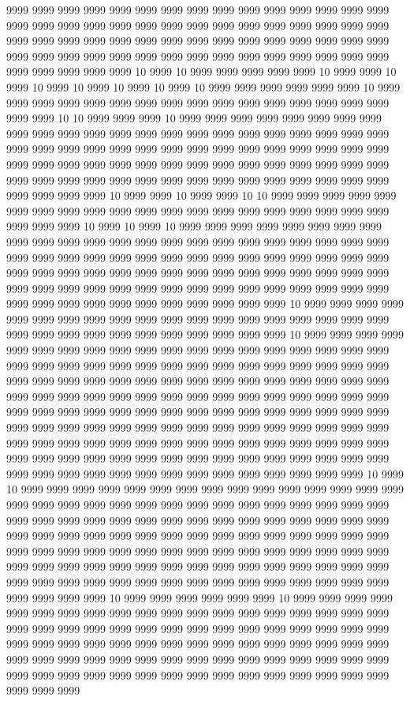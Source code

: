 9999 9999 9999 9999 9999 9999 9999 9999 9999 9999 9999 9999 9999 9999 9999 9999 9999 9999 9999 9999 9999 9999 9999 9999 9999 9999 9999 9999 9999 9999 9999 9999 9999 9999 9999 9999 9999 9999 9999 9999 9999 9999 9999 9999 9999 9999 9999 9999 9999 9999 9999 9999 9999 9999 9999 9999 9999 9999 9999 9999 9999 9999 9999 9999 9999 10 9999 10 9999 9999 9999 9999 9999 10 9999 9999 10 9999 10 9999 10 9999 10 9999 10 9999 10 9999 9999 9999 9999 9999 9999 10 9999 9999 9999 9999 9999 9999 9999 9999 9999 9999 9999 9999 9999 9999 9999 9999 9999 9999 10 10 9999 9999 9999 10 9999 9999 9999 9999 9999 9999 9999 9999 9999 9999 9999 9999 9999 9999 9999 9999 9999 9999 9999 9999 9999 9999 9999 9999 9999 9999 9999 9999 9999 9999 9999 9999 9999 9999 9999 9999 9999 9999 9999 9999 9999 9999 9999 9999 9999 9999 9999 9999 9999 9999 9999 9999 9999 9999 9999 9999 9999 9999 9999 9999 9999 9999 9999 9999 9999 9999 9999 9999 9999 9999 9999 9999 10 9999 9999 10 9999 9999 10 10 9999 9999 9999 9999 9999 9999 9999 9999 9999 9999 9999 9999 9999 9999 9999 9999 9999 9999 9999 9999 9999 9999 9999 10 9999 10 9999 10 9999 9999 9999 9999 9999 9999 9999 9999 9999 9999 9999 9999 9999 9999 9999 9999 9999 9999 9999 9999 9999 9999 9999 9999 9999 9999 9999 9999 9999 9999 9999 9999 9999 9999 9999 9999 9999 9999 9999 9999 9999 9999 9999 9999 9999 9999 9999 9999 9999 9999 9999 9999 9999 9999 9999 9999 9999 9999 9999 9999 9999 9999 9999 9999 9999 9999 9999 9999 9999 9999 9999 9999 9999 9999 9999 9999 9999 9999 9999 10 9999 9999 9999 9999 9999 9999 9999 9999 9999 9999 9999 9999 9999 9999 9999 9999 9999 9999 9999 9999 9999 9999 9999 9999 9999 9999 9999 9999 9999 9999 10 9999 9999 9999 9999 9999 9999 9999 9999 9999 9999 9999 9999 9999 9999 9999 9999 9999 9999 9999 9999 9999 9999 9999 9999 9999 9999 9999 9999 9999 9999 9999 9999 9999 9999 9999 9999 9999 9999 9999 9999 9999 9999 9999 9999 9999 9999 9999 9999 9999 9999 9999 9999 9999 9999 9999 9999 9999 9999 9999 9999 9999 9999 9999 9999 9999 9999 9999 9999 9999 9999 9999 9999 9999 9999 9999 9999 9999 9999 9999 9999 9999 9999 9999 9999 9999 9999 9999 9999 9999 9999 9999 9999 9999 9999 9999 9999 9999 9999 9999 9999 9999 9999 9999 9999 9999 9999 9999 9999 9999 9999 9999 9999 9999 9999 9999 9999 9999 9999 9999 9999 9999 9999 9999 9999 9999 9999 9999 9999 9999 9999 9999 9999 9999 9999 9999 9999 9999 9999 10 9999 10 9999 9999 9999 9999 9999 9999 9999 9999 9999 9999 9999 9999 9999 9999 9999 9999 9999 9999 9999 9999 9999 9999 9999 9999 9999 9999 9999 9999 9999 9999 9999 9999 9999 9999 9999 9999 9999 9999 9999 9999 9999 9999 9999 9999 9999 9999 9999 9999 9999 9999 9999 9999 9999 9999 9999 9999 9999 9999 9999 9999 9999 9999 9999 9999 9999 9999 9999 9999 9999 9999 9999 9999 9999 9999 9999 9999 9999 9999 9999 9999 9999 9999 9999 9999 9999 9999 9999 9999 9999 9999 9999 9999 9999 9999 9999 9999 9999 9999 9999 9999 9999 9999 9999 9999 9999 9999 9999 9999 9999 10 9999 9999 9999 9999 9999 9999 10 9999 9999 9999 9999 9999 9999 9999 9999 9999 9999 9999 9999 9999 9999 9999 9999 9999 9999 9999 9999 9999 9999 9999 9999 9999 9999 9999 9999 9999 9999 9999 9999 9999 9999 9999 9999 9999 9999 9999 9999 9999 9999 9999 9999 9999 9999 9999 9999 9999 9999 9999 9999 9999 9999 9999 9999 9999 9999 9999 9999 9999 9999 9999 9999 9999 9999 9999 9999 9999 9999 9999 9999 9999 9999 9999 9999 9999 9999 9999 9999 9999 9999 